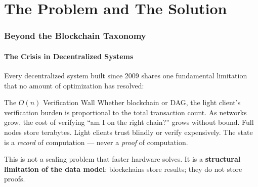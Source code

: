 \documentclass[11pt, a4paper]{article}
\theoremstyle{plain}
\theoremstyle{definition}
\theoremstyle{remark}
\begin{document}
\begin{abstract}
All four pillars are connected: encrypted envelopes enter the mempool,
the ordering ceremony commits the sequence, the threshold decrypt unlocks
the payloads, the fold pipeline compresses them into $\pi_E$, and the PoUW
derives consensus weight from the verified computation. The system's
safety rests on three \textbf{engineered structural zeros} and a total
soundness budget of $\epsilon_{\text{sys}} \approx 2^{-110}$ per epoch,
dominated by the threshold-BLS unforgeability assumption. The
implementation is C++20 with zero external cryptographic libraries,
verified by a bilingual golden-oracle methodology, passing 34/34
conformance tests, reproducible from a public repository.
\end{abstract}

\tableofcontents
\newpage

\part{The Problem and The Solution}

\section{Beyond the Blockchain Taxonomy}
\label{sec:intro}

\subsection{The Crisis in Decentralized Systems}

Every decentralized system built since 2009 shares one fundamental
limitation that no amount of optimization has resolved:

\begin{keybox}{The $O(n)$ Verification Wall}
Whether blockchain or DAG, the light client's verification burden is
proportional to the total transaction count. As networks grow, the
cost of verifying ``am I on the right chain?'' grows without bound.
Full nodes store terabytes. Light clients trust blindly or verify
expensively. The state is a \emph{record} of computation --- never
a \emph{proof} of computation.
\end{keybox}

This is not a scaling problem that faster hardware solves. It is a
\textbf{structural limitation of the data model}: blockchains store
results; they do not store proofs.
\end{document}

